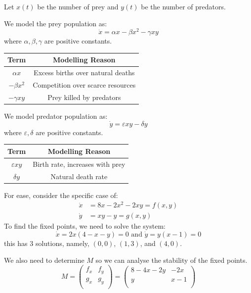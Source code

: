 \documentclass[../main.tex]{subfiles}
\begin{document}
\begin{example}
  Let $x(t)$ be the number of prey and $y(t)$ be the number of predators.

  We model the prey population as:
  \[
    \dot{x} = \alpha x - \beta x^2 - \gamma xy
  \]
  where $\alpha, \beta, \gamma$ are positive constants.
  \begin{center}
  \begin{tabular}{c|c}
  Term & Modelling Reason  \\
  \hline
  $\alpha x$ & Excess births over natural deaths \\
  $-\beta x^2$ &  Competition over scarce resources \\
  $-\gamma xy$ &  Prey killed by predators\\
  \end{tabular}
  \end{center}

  We model predator population as:
  \[
    \dot{y} = \varepsilon xy - \delta y
  \]
  where $\varepsilon, \delta$ are positive constants.
  \begin{center}
  \begin{tabular}{c|c}
  Term & Modelling Reason  \\
  \hline
  $\varepsilon xy$ & Birth rate, increases with prey \\
  $\delta y$ & Natural death rate \\
  \end{tabular}
  \end{center}

  For ease, consider the specific case of:
  \begin{align*}
    \dot{x} &= 8x - 2x^2 - 2xy = f(x, y) \\
    \dot{y} &= xy - y = g(x, y)
  \end{align*}
  To find the fixed points, we need to solve the system:
  \[
    \dot{x} = 2x(4 - x - y) = 0 \text{ and } \dot{y} = y(x - 1) = 0
  \]
  this has 3 solutions, namely, $(0, 0)$, $(1, 3)$, and $(4, 0)$.

  We also need to determine $M$ so we can analyse the stability of the fixed points.
  \[
    M = \begin{pmatrix}
    f_x & f_y \\
    g_x & g_y \\
    \end{pmatrix} =
    \begin{pmatrix}
    8 - 4x - 2y & -2x \\
    y & x - 1 \\
    \end{pmatrix}
  \]


\end{example}
\end{document}
